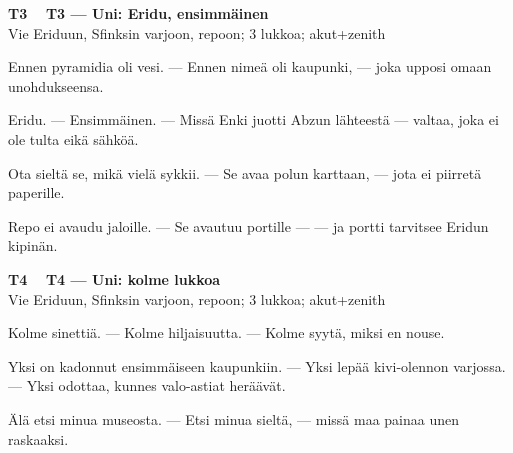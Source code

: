 \documentclass[a4paper,11pt]{article}
\begin{document}
\filbreak
\vspace{0.9mm}
\noindent
\begin{tcolorbox}[
  colframe=tothcol,
  colback=white,
  boxrule=0.8pt,
  arc=0pt,
  outer arc=0pt,
  left=2.5mm, right=2.5mm, top=2mm, bottom=2mm,
  boxsep=0.5mm,
  sharp corners,
  enhanced,
  breakable=false
]
{\large\ttfamily\bfseries T3}~~
{\normalsize\bfseries T3 --- Uni: Eridu, ensimmäinen}\\[0.2em]
{\small\color{black!65} Vie Eriduun, Sfinksin varjoon, repoon; 3 lukkoa; akut+zenith}\\[0.35em]
{\normalsize\raggedright Ennen pyramidia oli vesi. --- Ennen nimeä oli kaupunki, --- joka upposi omaan unohdukseensa.

Eridu. --- Ensimmäinen. --- Missä Enki juotti Abzun lähteestä --- valtaa, joka ei ole tulta eikä sähköä.

Ota sieltä se, mikä vielä sykkii. --- Se avaa polun karttaan, --- jota ei piirretä paperille.

Repo ei avaudu jaloille. --- Se avautuu portille --- --- ja portti tarvitsee Eridun kipinän.}
\end{tcolorbox}

\filbreak
\vspace{0.9mm}
\noindent
\begin{tcolorbox}[
  colframe=tothcol,
  colback=white,
  boxrule=0.8pt,
  arc=0pt,
  outer arc=0pt,
  left=2.5mm, right=2.5mm, top=2mm, bottom=2mm,
  boxsep=0.5mm,
  sharp corners,
  enhanced,
  breakable=false
]
{\large\ttfamily\bfseries T4}~~
{\normalsize\bfseries T4 --- Uni: kolme lukkoa}\\[0.2em]
{\small\color{black!65} Vie Eriduun, Sfinksin varjoon, repoon; 3 lukkoa; akut+zenith}\\[0.35em]
{\normalsize\raggedright Kolme sinettiä. --- Kolme hiljaisuutta. --- Kolme syytä, miksi en nouse.

Yksi on kadonnut ensimmäiseen kaupunkiin. --- Yksi lepää kivi-olennon varjossa. --- Yksi odottaa, kunnes valo-astiat heräävät.

Älä etsi minua museosta. --- Etsi minua sieltä, --- missä maa painaa unen raskaaksi.}
\end{tcolorbox}
\end{document}
